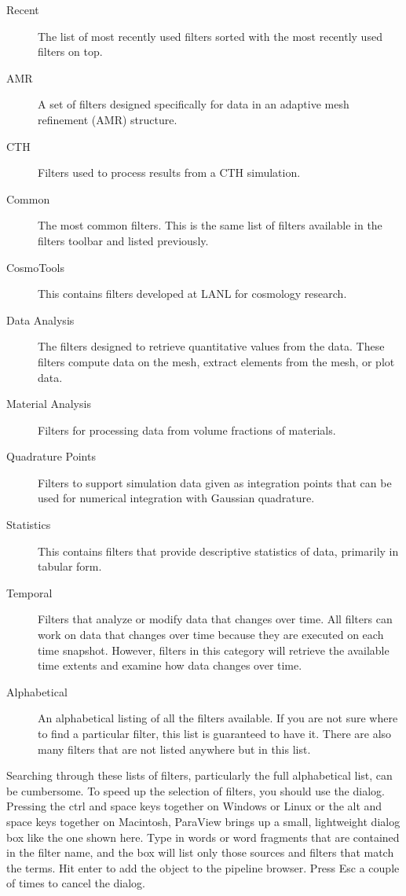 \begin{description}
\item[Recent] The list of most recently used filters sorted with the most
  recently used filters on top.
\item[AMR] A set of filters designed specifically for data in an adaptive
  mesh refinement (AMR)  structure.
\item[CTH] Filters used to process results from a CTH  simulation.
\item[Common] The most common filters.  This is the same list of filters
  available in the filters toolbar and listed previously.
\item[CosmoTools] This contains filters developed at LANL for cosmology
  research.
\item[Data Analysis] The filters designed to retrieve quantitative values
  from the data.  These filters compute data on the mesh, extract elements
  from the mesh, or plot data.
\item[Material Analysis] Filters for processing data from volume fractions
  of materials.
\item[Quadrature Points] Filters to support simulation data given as
  integration points that can be used for numerical integration with
  Gaussian quadrature.
\item[Statistics] This contains filters that provide descriptive
  statistics of data, primarily in tabular form.
\item[Temporal] Filters that analyze or modify data that changes over time.
  All filters can work on data that changes over time because they are
  executed on each time snapshot.  However, filters in this category will
  retrieve the available time extents and examine how data changes over
  time.
\item[Alphabetical] An alphabetical listing of all the filters available.
  If you are not sure where to find a particular filter, this list is
  guaranteed to have it.  There are also many filters that are not listed
  anywhere but in this list.
\end{description}




Searching through these lists of filters, particularly the full
alphabetical list, can be cumbersome.  To speed up the selection of
filters, you should use the  dialog.  Pressing the ctrl
and space keys together on Windows or Linux or the alt and space keys
together on Macintosh, ParaView brings up a small, lightweight dialog box
like the one shown here.  Type in words or word fragments that are
contained in the filter name, and the box will list only those sources and
filters that match the terms.  Hit enter to add the object to the pipeline
browser.  Press Esc a couple of times to cancel the dialog.

